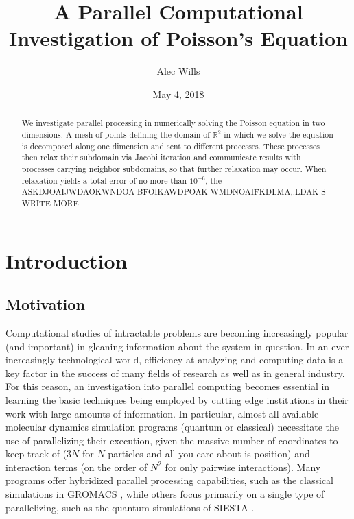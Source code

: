 \documentclass[reprint, amsmath, amssymb, aps, floatfix]{revtex4-1}
\begin{document}
\title{A Parallel Computational Investigation of Poisson's Equation}

\author{Alec Wills}
\date{May 4, 2018}

\begin{abstract}
	We investigate  parallel processing in numerically solving the Poisson equation in two dimensions. A mesh of points defining the domain of $\mathbb{R}^2$ in which we solve the equation is decomposed along one dimension and sent to different processes. These processes then relax their subdomain via Jacobi iteration and communicate results with processes carrying neighbor subdomains, so that further relaxation may occur. When relaxation yields a total error of no more than $10^{-6}$, the ASKDJOAIJWDAOKWNDOA BFOIKAWDPOAK WMDNOAIFKDLMA,;LDAK S WRITE MORE
\end{abstract}

\maketitle

\section{Introduction}

\subsection{Motivation}

Computational studies of intractable problems are becoming increasingly popular (and important) in gleaning information about the system in question. In an ever increasingly technological world, efficiency at analyzing and computing data is a key factor in the success of many fields of research as well as in general industry. For this reason, an investigation into parallel computing becomes essential in learning the basic techniques being employed by cutting edge institutions in their work with large amounts of information. In particular, almost all available molecular dynamics simulation programs (quantum or classical) necessitate the use of parallelizing their execution, given the massive number of coordinates to keep track of ($3N$ for $N$ particles and all you care about is position) and interaction terms (on the order of $N^2$ for only pairwise interactions). Many programs offer hybridized parallel processing capabilities, such as the classical simulations in GROMACS \cite{gromacs}, while others focus primarily on a single type of parallelizing, such as the quantum simulations of SIESTA \cite{siesta}.
\end{document}
